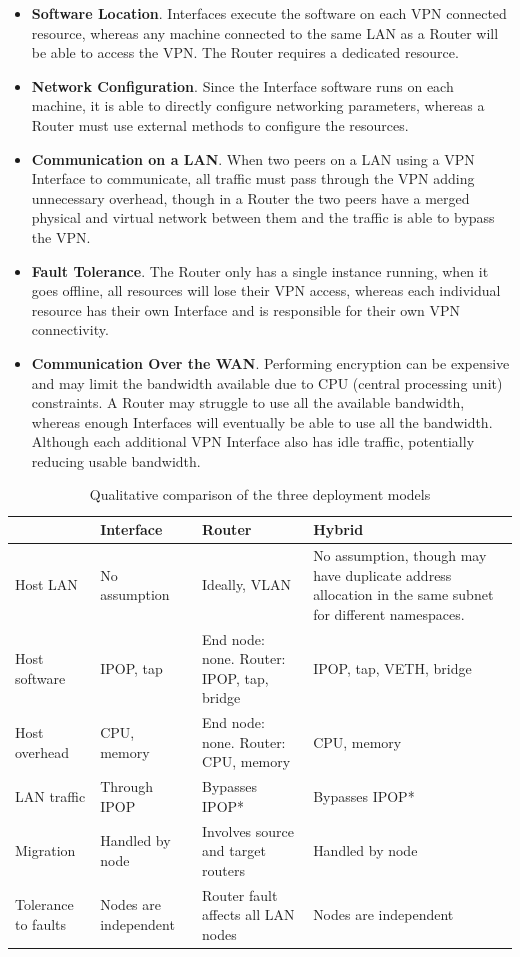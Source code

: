 \begin{itemize}

\item {\bf Software Location}. Interfaces execute the software on each VPN
connected resource, whereas any machine connected to the same LAN as a Router
will be able to access the VPN.  The Router requires a dedicated resource.

\item {\bf Network Configuration}. Since the Interface software runs on each
machine, it is able to directly configure networking parameters, whereas a
Router must use external methods to configure the resources.

\item {\bf Communication on a LAN}. When two peers on a LAN using a VPN
Interface to communicate, all traffic must pass through the VPN adding
unnecessary overhead, though in a Router the two peers have a merged physical
and virtual network between them and the traffic is able to bypass the VPN.

\item {\bf Fault Tolerance}. The Router only has a single instance running,
when it goes offline, all resources will lose their VPN access, whereas each
individual resource has their own Interface and is responsible for their own
VPN connectivity.

\item {\bf Communication Over the WAN}. Performing encryption can be expensive
and may limit the bandwidth available due to CPU (central processing unit)
constraints.  A Router may struggle to use all the available bandwidth, whereas
enough Interfaces will eventually be able to use all the bandwidth.  Although
each additional VPN Interface also has idle traffic, potentially reducing
usable bandwidth.

\end{itemize}

\begin{table}
\caption{Qualitative comparison of the three deployment models}
\label{tab:three_models}
\centering
\begin{tabular}{p{.95in}p{1.25in}p{1.5in}p{2.2in}} \hline
 & Interface & Router & Hybrid \\ \hline
Host LAN 
& 
No assumption 
& 
Ideally, VLAN
&
No assumption, though may have duplicate address allocation in the same subnet
for different namespaces.\footnotemark[2]
\\
Host software
&
IPOP, tap
&
End node: none. Router: IPOP, tap, bridge 
&
IPOP, tap, VETH, bridge \\
Host overhead
&
CPU, memory
& 
End node: none. Router: CPU, memory
&
CPU, memory \\
LAN traffic
&
Through IPOP
&
Bypasses IPOP*
&
Bypasses IPOP* \\
Migration
&
Handled by node
&
Involves source and target routers
&
Handled by node \\
Tolerance to faults
&
Nodes are independent
&
Router fault affects all LAN nodes
&
Nodes are independent \\ \hline
\end{tabular}
\end{table}

